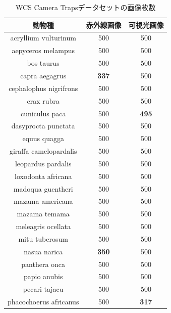 \documentclass[a4paper,11pt,nomag]{jsreport}
\begin{document}
\begin{table}[tbp]
  \centering
  \caption{WCS Camera Trapsデータセットの画像枚数}
  \label{tbl:wcs}
  \begin{tabular}{c|c|c}
      \hline
      動物種                    & 赤外線画像     & 可視光画像    \\ \hline\hline
      acryllium vulturinum     & 500          & 500          \\
      aepyceros melampus       & 500          & 500          \\
      bos taurus               & 500          & 500          \\
      capra aegagrus           & \textbf{337} & 500          \\
      cephalophus nigrifrons   & 500          & 500          \\
      crax rubra               & 500          & 500          \\
      cuniculus paca           & 500          & \textbf{495} \\
      dasyprocta punctata      & 500          & 500          \\
      equus quagga             & 500          & 500          \\
      giraffa camelopardalis   & 500          & 500          \\
      leopardus pardalis       & 500          & 500          \\
      loxodonta africana       & 500          & 500          \\
      madoqua guentheri        & 500          & 500          \\
      mazama americana         & 500          & 500          \\
      mazama temama            & 500          & 500          \\
      meleagris ocellata       & 500          & 500          \\
      mitu tuberosum           & 500          & 500          \\
      nasua narica             & \textbf{350} & 500          \\
      panthera onca            & 500          & 500          \\
      papio anubis             & 500          & 500          \\
      pecari tajacu            & 500          & 500          \\
      phacochoerus africanus   & 500          & \textbf{317} \\

\end{tabular}
\end{table}
\end{document}
